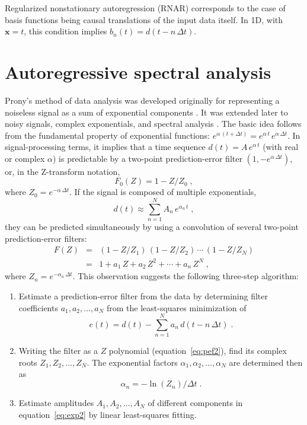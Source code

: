 Regularized nonstationary autoregression (RNAR) corresponds to the
case of basis functions being causal translations of the input data
itself. In 1D, with $\mathbf{x}=t$, this condition implies $b_n(t) =
d(t-n\,\Delta t)$.

\section{Autoregressive spectral analysis}

Prony's method of data analysis was developed originally for
representing a noiseless signal as a sum of exponential components
\cite[]{prony}. It was extended later to noisy signals, complex
exponentials, and spectral analysis
\cite[]{pisarenko,marple,MSA00-00-05300530,beylkin}. The basic idea follows
from the fundamental property of exponential functions:
$e^{\alpha\,(t+\Delta t)} = e^{\alpha\,t}\,e^{\alpha\,\Delta t}$.  In
signal-processing terms, it implies that a time sequence
$d(t)=A\,e^{\alpha\,t}$ (with real or complex $\alpha$) is predictable
by a two-point prediction-error filter $\left(1,-e^{\alpha\,\Delta
t}\right)$, or, in the Z-transform notation,
\begin{equation}
F_0(Z) = 1-Z/Z_0\;,
\label{eq:pef}
\end{equation}
where $Z_0 = e^{-\alpha\,\Delta t}$. If the signal is composed of multiple exponentials,
\begin{equation}
  d(t) \approx \sum\limits_{n=1}^{N} A_n\,e^{\alpha_n\,t}\;,
\label{eq:exp2}
\end{equation}
they can be predicted simultaneously by using a convolution of several
two-point prediction-error filters:
\begin{eqnarray}
\nonumber
  F(Z) & = & (1-Z/Z_1)\, (1-Z/Z_2)\,\cdots\, (1-Z/Z_N) \\ 
  & = & 1 + a_1\,Z + a_2\,Z^2 + \cdots + a_n\,Z^N\;,
\label{eq:pef2}
\end{eqnarray}
where $Z_n = e^{-\alpha_n\,\Delta t}$.
This observation suggests the following three-step algorithm:
\begin{enumerate}
\item Estimate a prediction-error filter from the data by determining filter coefficients $a_1, a_2, \ldots, a_N$ from the least-squares minimization of
\begin{equation}
\label{eq:res}
e(t) =  d(t) - \sum_{n=1}^{N} a_n\,d(t-n\,\Delta t)\;.
\end{equation}
\item Writing the filter as a $Z$ polynomial (equation~\ref{eq:pef2}), find its complex roots $Z_1, Z_2, \ldots, Z_N$. The exponential factors $\alpha_1, \alpha_2, \ldots, \alpha_N$ are determined then as 
\begin{equation}
\label{eq:alpha}
\alpha_n = -\ln(Z_n)/\Delta t\;.
\end{equation}
\item Estimate amplitudes $A_1,A_2, \ldots, A_N$ of different components in equation~\ref{eq:exp2} by linear least-squares fitting.
\end{enumerate}

